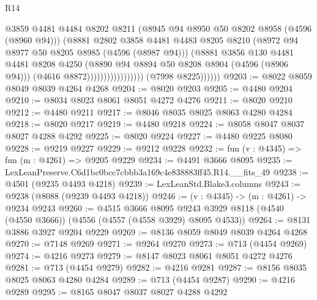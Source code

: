 \begin{lexlean}{R14}
\begin{coremodule}
                                          @3859
                                          @4481
                                          @4484
                                          @8202
                                          @8211
                                          (@8945 @94 @8950 @50 @8202 @8958 (@4596 (@8960 @94)))
                                          (@8881
                                            @2802
                                            @3858
                                            @4481
                                            @4483
                                            @8205
                                            @8210
                                            (@8972 @94 @8977 @50 @8205 @8985 (@4596 (@8987 @94)))
                                            (@8881
                                              @3856
                                              @130
                                              @4481
                                              @4481
                                              @8208
                                              @4250
                                              (@8890 @94 @8894 @50 @8208 @8904 (@4596 (@8906 @94)))
                                              (@4616 @8872)))))))))))))))))
              (@7998 @8225))))))
@9203 := @8022 @8059 @8049 @8039 @4264 @4268
@9204 := @8020 @9203
@9205 := @4480 @9204
@9210 := @8034 @8023 @8061 @8051 @4272 @4276
@9211 := @8020 @9210
@9212 := @4480 @9211
@9217 := @8046 @8035 @8025 @8063 @4280 @4284
@9218 := @8020 @9217
@9219 := @4480 @9218
@9224 := @8058 @8047 @8037 @8027 @4288 @4292
@9225 := @8020 @9224
@9227 := @4480 @9225 @8080
@9228 := @9219 @9227
@9229 := @9212 @9228
@9232 := fun (v : @4345) => fun (m : @4261) => @9205 @9229
@9234 := @4491 @3666 @8095
@9235 := LexLeanPreserve.C6d1bc0bcc7cbbb3a169c4e838883ff45.R14.__fits_49
@9238 := @4501 (@9235 @4493 @4218)
@9239 := LexLeanStd.Blake3.columns
@9243 := @9238 (@8088 (@9239 @4493 @4218))
@9246 := (v : @4345) -> (m : @4261) -> @9234 @9243
@9260 := @4515
    @3666
    @8095
    @9243
    @3929
    @8118
    (@4540 (@4550 @3666))
    (@4556 (@4557 (@4558 @3929) @8095 @4533))
@9264 := @8131 @3886 @3927 @9204 @9229
@9269 := @8136 @8059 @8049 @8039 @4264 @4268
@9270 := @7148 @9269
@9271 := @9264 @9270
@9273 := @713 (@4454 @9269)
@9274 := @4216 @9273
@9279 := @8147 @8023 @8061 @8051 @4272 @4276
@9281 := @713 (@4454 @9279)
@9282 := @4216 @9281
@9287 := @8156 @8035 @8025 @8063 @4280 @4284
@9289 := @713 (@4454 @9287)
@9290 := @4216 @9289
@9295 := @8165 @8047 @8037 @8027 @4288 @4292

\end{coremodule}
\end{lexlean}
